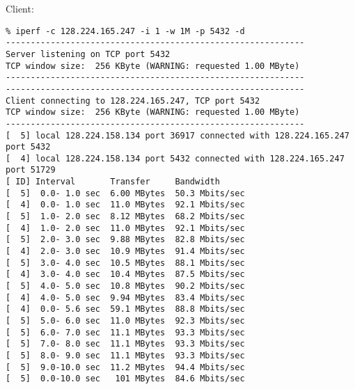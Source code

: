 \documentclass[a4paper]{report}
\begin{document}
Client:
\begin{lstlisting}
% iperf -c 128.224.165.247 -i 1 -w 1M -p 5432 -d
------------------------------------------------------------
Server listening on TCP port 5432
TCP window size:  256 KByte (WARNING: requested 1.00 MByte)
------------------------------------------------------------
------------------------------------------------------------
Client connecting to 128.224.165.247, TCP port 5432
TCP window size:  256 KByte (WARNING: requested 1.00 MByte)
------------------------------------------------------------
[  5] local 128.224.158.134 port 36917 connected with 128.224.165.247 port 5432
[  4] local 128.224.158.134 port 5432 connected with 128.224.165.247 port 51729
[ ID] Interval       Transfer     Bandwidth
[  5]  0.0- 1.0 sec  6.00 MBytes  50.3 Mbits/sec
[  4]  0.0- 1.0 sec  11.0 MBytes  92.1 Mbits/sec
[  5]  1.0- 2.0 sec  8.12 MBytes  68.2 Mbits/sec
[  4]  1.0- 2.0 sec  11.0 MBytes  92.1 Mbits/sec
[  5]  2.0- 3.0 sec  9.88 MBytes  82.8 Mbits/sec
[  4]  2.0- 3.0 sec  10.9 MBytes  91.4 Mbits/sec
[  5]  3.0- 4.0 sec  10.5 MBytes  88.1 Mbits/sec
[  4]  3.0- 4.0 sec  10.4 MBytes  87.5 Mbits/sec
[  5]  4.0- 5.0 sec  10.8 MBytes  90.2 Mbits/sec
[  4]  4.0- 5.0 sec  9.94 MBytes  83.4 Mbits/sec
[  4]  0.0- 5.6 sec  59.1 MBytes  88.8 Mbits/sec
[  5]  5.0- 6.0 sec  11.0 MBytes  92.3 Mbits/sec
[  5]  6.0- 7.0 sec  11.1 MBytes  93.3 Mbits/sec
[  5]  7.0- 8.0 sec  11.1 MBytes  93.3 Mbits/sec
[  5]  8.0- 9.0 sec  11.1 MBytes  93.3 Mbits/sec
[  5]  9.0-10.0 sec  11.2 MBytes  94.4 Mbits/sec
[  5]  0.0-10.0 sec   101 MBytes  84.6 Mbits/sec
\end{lstlisting}
\end{document}
